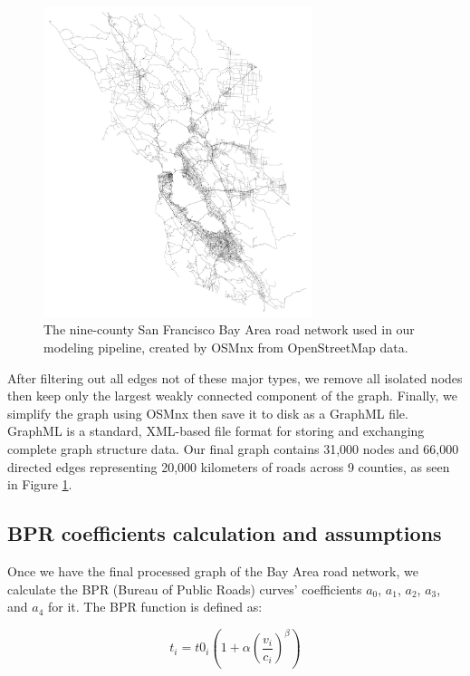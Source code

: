 \begin{figure}[ht]
\center
\includegraphics[width=0.7\textwidth]
{graphics/bay_area_network.png}
\caption{The nine-county San Francisco Bay Area road network used in our modeling pipeline, created by OSMnx from OpenStreetMap data.}
\label{fig:bay_area_road_network}
\end{figure}

After filtering out all edges not of these major types, we remove all isolated nodes then keep only the largest weakly connected component of the graph. Finally, we simplify the graph using OSMnx then save it to disk as a GraphML file. GraphML is a standard, XML-based file format for storing and exchanging complete graph structure data. Our final graph contains 31,000 nodes and 66,000 directed edges representing 20,000 kilometers of roads across 9 counties, as seen in Figure \ref{fig:bay_area_road_network}.

\subsection{BPR coefficients calculation and assumptions}
Once we have the final processed graph of the Bay Area road network, we calculate the BPR (Bureau of Public Roads) curves' coefficients $a_0$, $a_1$, $a_2$, $a_3$, and $a_4$ for it. The BPR function is defined as:

\bigskip
\begin{equation}
    t_i = t0_i (1 + \alpha (\frac{v_i}{c_i}) ^ \beta)
    \label{eq:bpr_function}
\end{equation}

